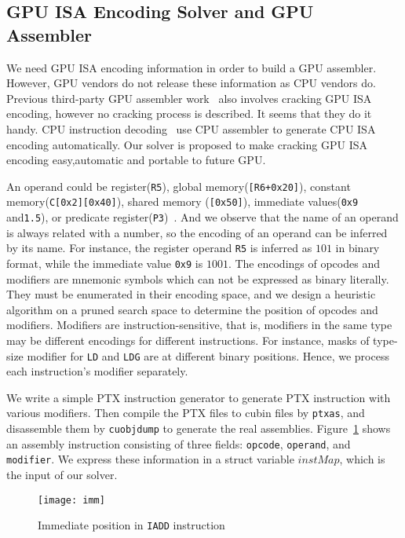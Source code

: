\subsection{GPU ISA Encoding Solver and GPU Assembler}
We need GPU ISA encoding information in order to build a GPU assembler.
However, GPU vendors do not release these information as CPU vendors do.
Previous third-party GPU assembler work~\cite{decuda,asfermi,maxas} also
involves cracking GPU ISA encoding, however no cracking process is described.
It seems that they do it handy. CPU instruction decoding~\cite{collberg1997reverse,engler2000derive} use CPU assembler to generate CPU ISA encoding automatically. Our solver is proposed to make cracking GPU ISA
encoding easy,automatic and portable to future GPU.

An operand could be register({\tt R5}), 
global memory({\tt [R6+0x20]}), constant memory({\tt C[0x2][0x40]}), shared memory ({\tt [0x50]}),
immediate values({\tt 0x9} and{\tt1.5}), or predicate register({\tt P3})~\cite{ptx2015isa}. %
And we observe that the name of an operand is always related with a number, so the encoding of an operand can be inferred by its name.
For instance, the register operand {\tt R5} is inferred as $101$ in binary format, while the immediate value {\tt 0x9} is $1001$. 
The encodings of opcodes and modifiers are mnemonic symbols which can not be expressed as binary literally. 
They must be enumerated in their encoding space, and we design a heuristic algorithm on a pruned search space to
determine the position of opcodes and modifiers.
Modifiers are instruction-sensitive, that is, modifiers in the same type may be different encodings for different instructions. 
For instance, masks of type-size
modifier for {\tt LD} and {\tt LDG} are at different binary positions. Hence, we process each instruction's modifier separately. 

We write a simple PTX instruction generator to generate PTX instruction with various modifiers.
Then compile the PTX files to cubin files by {\tt ptxas}, and disassemble them by {\tt cuobjdump} to generate the real assemblies. 
Figure~\ref{fig:imm} shows an assembly instruction consisting of three fields: {\tt opcode}, {\tt operand}, and {\tt modifier}. We express these information in a struct
variable $instMap$, which is the input of our solver.
\begin{figure}[htbp]
\begin{center}
\texttt{[image: imm]}
    \caption{Immediate position in {\tt IADD} instruction}
\label{fig:imm}
\end{center}
\end{figure}


